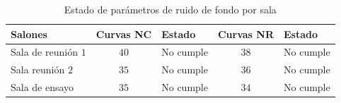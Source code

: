 \begin{table}[H]
    \centering
    \begin{tabular}{|l|c|l|c|l|}
    \hline
    \textbf{Salones} & \textbf{Curvas NC} & \textbf{Estado} & \textbf{Curvas NR}  & \textbf{Estado} \\ \hline
     Sala de reunión $1$ & $40$ & No cumple & $38$ & No cumple \\ \hline
     Sala reunión $2$ & $35$ & No cumple & $36$ & No cumple \\ \hline
     Sala de ensayo & $35$ & No cumple & $34$ & No cumple\\ \hline
    \end{tabular}
    \caption{Estado de parámetros de ruido de fondo por sala}
    \label{tab: cumplimiento de Rdf}
\end{table}


